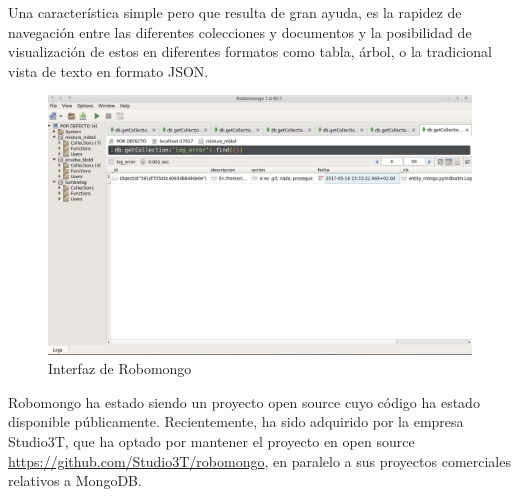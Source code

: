 Una característica simple pero que resulta de gran ayuda, es la rapidez de navegación entre las diferentes colecciones y documentos y la posibilidad de visualización de estos en diferentes formatos como tabla, árbol, o la tradicional vista de texto en formato JSON.


\begin{figure}[H]
   \centering
   \includegraphics[width=16cm]{img/robomongo}
   \caption{Interfaz de Robomongo}
   \label{figura:robomongo}
\end{figure}


Robomongo ha estado siendo un proyecto open source cuyo código ha estado disponible públicamente. Recientemente, ha sido adquirido por la empresa Studio3T, que ha optado por mantener el proyecto en  open source \url{https://github.com/Studio3T/robomongo}, en paralelo a sus proyectos comerciales relativos a MongoDB.
